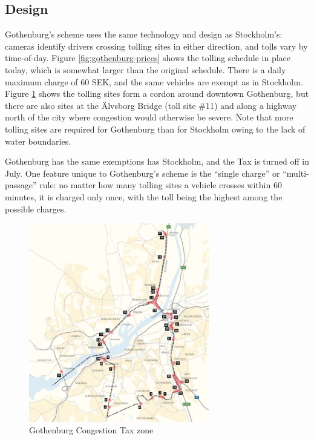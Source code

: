 \subsection{Design}

Gothenburg's scheme uses the same technology and design as Stockholm's: cameras identify drivers crossing tolling sites in either direction, and tolls vary by time-of-day. Figure \ref{fig:gothenburg-prices} shows the tolling schedule in place today, which is somewhat larger than the original schedule. There is a daily maximum charge of 60 SEK, and the same vehicles are exempt as in Stockholm. Figure \ref{fig:Gothenburg-map} shows the tolling sites form a cordon around downtown Gothenburg, but there are also sites at the \"Alvsborg Bridge (toll site \#11) and along a highway north of the city where congestion would otherwise be severe. Note that more tolling sites are required for Gothenburg than for Stockholm owing to the lack of water boundaries.

Gothenburg has the same exemptions has Stockholm, and the Tax is turned off in July. One feature unique to Gothenburg's scheme is the ``single charge'' or  ``multi-passage'' rule: no matter how many tolling sites a vehicle crosses within 60 minutes, it is charged only once, with the toll being the highest among the possible charges. 

\begin{figure}[ht]
\includegraphics[width=0.7\textwidth]{../img/gburg-map.png}
\caption{Gothenburg Congestion Tax zone \citep{transportstyrelsen2015}\label{fig:Gothenburg-map}}
\end{figure}

